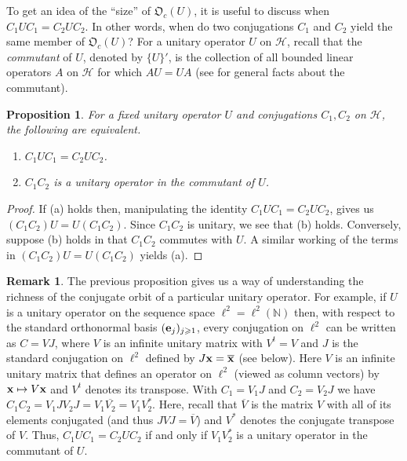 \documentclass{dis}
\theoremstyle{plain}
\newtheorem{Proposition}[equation]{Proposition}
\theoremstyle{definition}
\newtheorem{Remark}[equation]{Remark}
\def\N{\mathbb{N}}
\renewcommand{\geq}{\geqslant}
\renewcommand{\vec}[1]{{\bf #1}}
\newcommand{\0}{{\color{lightgray}0}}
\begin{document}
To get an idea of  the ``size'' of $\mathfrak{O}_c(U)$, it is useful to discuss when
$C_1 U C _1 = C_2 U C_2.$
In other words, when do two conjugations $C_1$ and $C_2$ yield the same member of $\mathfrak{O}_c(U)$? For a unitary operator $U$ on $\mathcal{H}$, recall that the {\em commutant} of $U$, denoted by $\{U\}'$, is the collection of  all bounded linear operators $A$ on $\mathcal{H}$ for which $AU = UA$ (see \cite{MR1721402} for general facts about the commutant). 

\begin{Proposition}\label{09876tygbhn}
For a fixed unitary operator $U$ and conjugations $C_1, C_2$ on $\mathcal{H}$, the following are equivalent.
\begin{enumerate}
\item $C_1 U C_1 = C_2 U C_2$.
\item $C_1 C_2$ is a unitary operator in the commutant of $U$.
\end{enumerate}
\end{Proposition}

\begin{proof}
If (a) holds then, manipulating the identity $C_1 U C_1 = C_2 U C_2$, gives us 
$(C_1 C_2) U = U (C_1 C_2).$ Since $C_1 C_2$ is unitary, we see that  (b) holds. Conversely, suppose (b) holds in that $C_1 C_2$ commutes with $U$. A similar working of the terms in  $(C_1 C_2) U = U (C_1 C_2)$ yields (a).
\end{proof}

\begin{Remark}\label{commuttannt}
The previous proposition gives us a way of understanding the richness of the conjugate orbit of a particular unitary operator. For example, if $U$ is a unitary operator on the sequence space $\ell^2 = \ell^2(\N)$ then, with respect to the standard orthonormal basis $(\vec{e}_j)_{j \geq 1}$, every conjugation  on $\ell^2$ can be written as $C = V J$, where $V$ is an infinite unitary matrix with $V^{t} = V$ and $J$ is the standard conjugation on $\ell^2$ defined by  $J \vec{x} = \overline{\vec{x}}$ (see below). Here $V$ is an infinite unitary matrix that defines an operator on $\ell^2$ (viewed as column vectors) by $\vec{x} \mapsto V \vec{x}$ and $V^{t}$ denotes its transpose.  With $C_{1} = V_{1} J$ and $C_2 = V_2 J$ we have
$C_{1} C_2 = V_1 J V_2 J = V_{1} \overline{V_2} = V_{1} V_{2}^{*}.$ Here, recall that $\overline{V}$ is the matrix $V$ with all of its elements conjugated (and thus $J V J = \overline{V}$) and $V^{*}$ denotes the conjugate transpose of $V$.
Thus, $C_1 U C_1 = C_2 U C_2$ if and only if $V_{1} V_{2}^{*}$ is a unitary operator in  the commutant of $U$.
\end{Remark}
\end{document}
